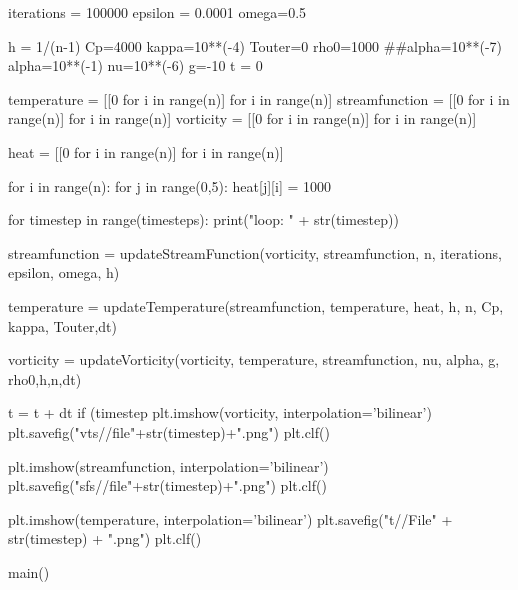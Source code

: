 	iterations = 100000
	epsilon = 0.0001
	omega=0.5
	
	h = 1/(n-1)
	Cp=4000
	kappa=10**(-4)
	Touter=0
	rho0=1000
	##alpha=10**(-7)
	alpha=10**(-1)
	nu=10**(-6)
	g=-10
	t = 0
	
	
		
	
	temperature = [[0 for i in range(n)] for i in range(n)]
	streamfunction = [[0 for i in range(n)] for i in range(n)]
	vorticity = [[0 for i in range(n)] for i in range(n)]
	
	heat = [[0 for i in range(n)] for i in range(n)]
	
	for i in range(n):
		for j in range(0,5):
			heat[j][i] =  1000
	
	for timestep in range(timesteps):
		print("loop: " + str(timestep))
		
		streamfunction = updateStreamFunction(vorticity, streamfunction, n, iterations, epsilon, omega, h)
		
		temperature = updateTemperature(streamfunction, temperature, heat, h, n, Cp, kappa, Touter,dt)
		
		vorticity = updateVorticity(vorticity, temperature, streamfunction, nu, alpha, g, rho0,h,n,dt)
		
		t = t + dt
		if (timestep %
			plt.imshow(vorticity, interpolation='bilinear')
			plt.savefig("vts//file"+str(timestep)+".png")
			plt.clf()
			
			plt.imshow(streamfunction, interpolation='bilinear')
			plt.savefig("sfs//file"+str(timestep)+".png")
			plt.clf()
			
			plt.imshow(temperature, interpolation='bilinear')
			plt.savefig("t//File" + str(timestep) + ".png")
			plt.clf()
		
		
		
		
main()
		
		

	
	
	
			


	
			
	
	
	
	
	
	
	

	
	
			
			

				
				
	
		
	
	
	

